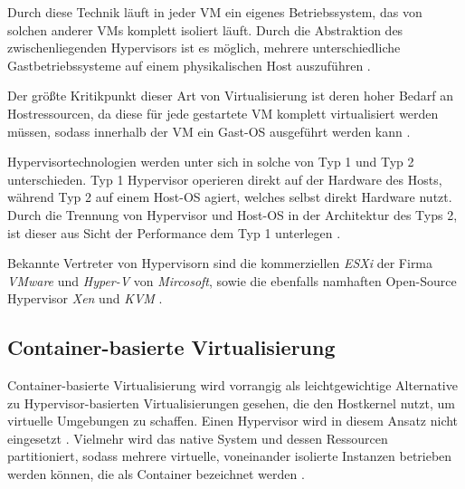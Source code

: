 \documentclass[../main.tex]{subfiles}
\begin{document}

      Durch diese Technik läuft in jeder \acrshort{VM} ein eigenes Betriebssystem, das von solchen anderer \acrshort{VM}s komplett isoliert läuft. Durch die Abstraktion des zwischenliegenden Hypervisors ist es möglich, mehrere unterschiedliche Gastbetriebssysteme auf einem physikalischen Host auszuführen \cite[S.2]{containerVirtPerformance}.

      Der größte Kritikpunkt dieser Art von Virtualisierung ist deren hoher Bedarf an Hostressourcen, da diese für jede gestartete \acrshort{VM} komplett virtualisiert werden müssen, sodass innerhalb der \acrshort{VM} ein Gast-\acrshort{OS} ausgeführt werden kann \cite[S.1]{dockerIntroIEEE}\cite[S.3]{dockerLXCKub}.

      Hypervisortechnologien werden unter sich in solche von Typ 1 und Typ 2 unterschieden. Typ 1 Hypervisor operieren direkt auf der Hardware des Hosts, während Typ 2 auf einem Host-\acrshort{OS} agiert, welches selbst direkt Hardware nutzt. Durch die Trennung von Hypervisor und Host-\acrshort{OS} in der Architektur des Typs 2, ist dieser aus Sicht der Performance dem Typ 1 unterlegen \cite[S.2]{dockerSec1}.

      Bekannte Vertreter von Hypervisorn sind die kommerziellen \emph{ESXi} der Firma \emph{VMware} und \emph{Hyper-V} von \emph{Mircosoft}, sowie die ebenfalls namhaften Open-Source Hypervisor \emph{Xen} und \emph{KVM} \cite[S.1]{dockerLXCKub}.

    \subsection{Container-basierte Virtualisierung}
    \label{introVirtContainer}
      Container-basierte Virtualisierung wird vorrangig als leichtgewichtige Alternative zu Hypervisor-basierten Virtualisierungen gesehen\cite[S.2]{containerVirtPerformance}, die den Hostkernel nutzt, um virtuelle Umgebungen zu schaffen. Einen Hypervisor wird in diesem Ansatz nicht eingesetzt \cite[S.7]{dockerBook}. Vielmehr wird das native System und dessen Ressourcen partitioniert, sodass mehrere virtuelle, voneinander isolierte Instanzen betrieben werden können, die als Container bezeichnet werden \cite[S.2]{containerVirtPerformance}\cite[S.1]{dockerSec1}.
\end{document}
